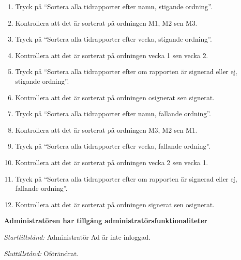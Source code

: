 \documentclass[a4paper]{article}
\begin{document}
\begin{ST}
\begin{enumerate}
\item Tryck på ``Sortera alla tidrapporter efter namn, stigande ordning''.
\item Kontrollera att det är sorterat på ordningen M1, M2 sen M3.
\item Tryck på ``Sortera alla tidrapporter efter vecka, stigande ordning''.
\item Kontrollera att det är sorterat på ordningen vecka 1 sen vecka 2.
\item Tryck på ``Sortera alla tidrapporter efter om rapporten är signerad eller ej, stigande ordning''.
\item Kontrollera att det är sorterat på ordningen osignerat sen signerat.
\item Tryck på ``Sortera alla tidrapporter efter namn, fallande ordning''.
\item Kontrollera att det är sorterat på ordningen M3, M2 sen M1.
\item Tryck på ``Sortera alla tidrapporter efter vecka, fallande ordning''.
\item Kontrollera att det är sorterat på ordningen vecka 2 sen vecka 1.
\item Tryck på ``Sortera alla tidrapporter efter om rapporten är signerad eller ej, fallande ordning''.
\item Kontrollera att det är sorterat på ordningen signerat sen osignerat.
\end{enumerate}

\item \textbf{Administratören har tillgång administratörsfunktionaliteter} 

\emph{Starttillstånd:} Administratör Ad är inte inloggad.

\emph{Sluttillstånd:} Oförändrat.


\end{ST}
\end{document}
